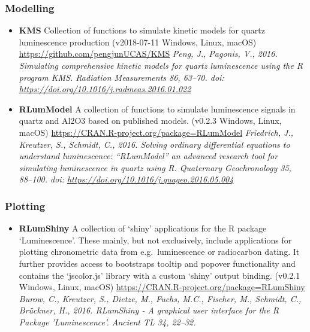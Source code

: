 \documentclass[]{article}
\providecommand{\tightlist}{%
  \setlength{\itemsep}{0pt}\setlength{\parskip}{0pt}}
\begin{document}
\hypertarget{modelling}{%
\subsubsection{Modelling}\label{modelling}}

\begin{itemize}
\tightlist
\item
  \textbf{KMS}
  Collection of functions to simulate kinetic models for quartz luminescence production
  (v2018-07-11 \textbar{} Windows, Linux, macOS)
  \url{https://github.com/pengjunUCAS/KMS}
  \emph{Peng, J., Pagonis, V., 2016. Simulating comprehensive kinetic models for quartz luminescence using the R program KMS. Radiation Measurements 86, 63--70. doi: \url{https://doi.org/10.1016/j.radmeas.2016.01.022}}
\item
  \textbf{RLumModel}
  A collection of functions to simulate luminescence signals in quartz and Al2O3 based on published models.
  (v0.2.3 \textbar{} Windows, Linux, macOS)
  \url{https://CRAN.R-project.org/package=RLumModel}
  \emph{Friedrich, J., Kreutzer, S., Schmidt, C., 2016. Solving ordinary differential equations to understand luminescence: ``RLumModel'' an advanced research tool for simulating luminescence in quartz using R. Quaternary Geochronology 35, 88--100. doi: \url{https://doi.org/10.1016/j.quageo.2016.05.004}}
\end{itemize}

\hypertarget{plotting}{%
\subsubsection{Plotting}\label{plotting}}

\begin{itemize}
\tightlist
\item
  \textbf{RLumShiny}
  A collection of `shiny' applications for the R package
  `Luminescence'. These mainly, but not exclusively, include applications for
  plotting chronometric data from e.g.~luminescence or radiocarbon dating. It
  further provides access to bootstraps tooltip and popover functionality and
  contains the `jscolor.js' library with a custom `shiny' output binding.
  (v0.2.1 \textbar{} Windows, Linux, macOS)
  \url{https://CRAN.R-project.org/package=RLumShiny}
  \emph{Burow, C., Kreutzer, S., Dietze, M., Fuchs, M.C., Fischer, M., Schmidt, C., Brückner, H., 2016. RLumShiny - A graphical user interface for the R Package 'Luminescence'. Ancient TL 34, 22--32.}
\end{itemize}
\end{document}

